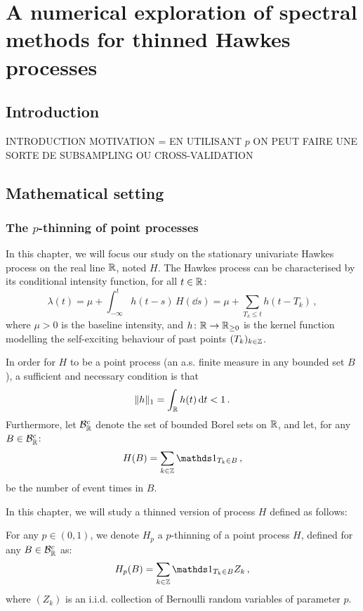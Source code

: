 
\chapter[][]{A numerical exploration of spectral methods for thinned Hawkes processes}

\section{Introduction}

INTRODUCTION
MOTIVATION = EN UTILISANT $p$ ON PEUT FAIRE UNE SORTE DE SUBSAMPLING OU CROSS-VALIDATION

\section{Mathematical setting}\label{sec:chap5_mathsetting}

\subsection{The $p$-thinning of point processes}\label{sec:chap5_hawkesprocess}

In this chapter, we will focus our study on the stationary univariate Hawkes process on the real line ${\mathbb R}$, noted $H$.
The Hawkes process can be characterised by its conditional intensity function, for all $t\in{\mathbb R}$:
\begin{equation}\label{eq:chap5_hawkes_intensity}
    \lambda(t) = \mu + \int_{-\infty}^{t}{h(t-s)\,H(\dd s)} = \mu + \sum_{T_k \leq t}{h(t-T_k)}\,,
\end{equation}
where $\mu > 0$ is the baseline intensity, and $h\colon{\mathbb R}\to {\mathbb R}_{\geq 0}$ is the kernel function modelling the self-exciting behaviour of past points $(T_k)_{k\in{\mathbb Z}}$.

In order for $H$ to be a point process (\ie an a.s. finite measure in any bounded set $B$), 
a sufficient and necessary condition \parencite{Hawkes1971} is that 
\[\|h\|_1 = \int_{{\mathbb R}}{h(t)\,{\mathrm{d}} t} < 1\,.\]
Furthermore, let $\mathcal{B}_{{\mathbb R}}^c$ denote the set of bounded Borel sets on ${\mathbb R}$, and let, for any $B\in\mathcal{B}_{{\mathbb R}}^c$:
\[H(B) = \sum_{k\in\ZZ}{\II_{T_k \in B}}\,,\]
be the number of event times in $B$. 

In this chapter, we will study a thinned version of process $H$ defined as follows:
\begin{definition}\label{def:chap5_thinning}
For any $p\in(0,1)$, we denote $H_p$ a $p$-thinning of a point process $H$, defined for any $B\in\mathcal{B}_{{\mathbb R}}^c$ as:
\[H_p(B) = \sum_{k\in\ZZ}{\II_{T_k \in B} Z_k}\,,\]
where $(Z_k)$ is an i.i.d. collection of Bernoulli random variables of parameter $p$.
\end{definition}

